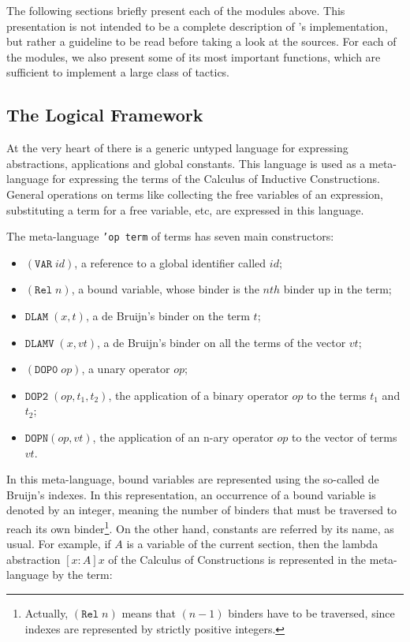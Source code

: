 \vspace{1em}

The following sections briefly present each of the modules above.
This presentation is not intended to be a complete description of \Coq's
implementation, but rather a guideline to be read before taking a look
at the sources. For each of the modules, we also present some of its
most important functions, which are sufficient to implement a large
class of tactics.


\subsection[The Logical Framework]{The Logical Framework\label{LogicalFramework}}

At the very heart of \Coq there is a generic untyped language for
expressing abstractions, applications and global constants. This
language is used as a meta-language for expressing the terms of the
Calculus of Inductive Constructions. General operations on terms like
collecting the free variables of an expression, substituting a term for
a free variable, etc, are expressed in this language.

The meta-language \texttt{'op term} of terms has seven main
constructors:
\begin{itemize}
\item $(\texttt{VAR}\;id)$, a reference to a global identifier called  $id$;
\item $(\texttt{Rel}\;n)$, a bound variable, whose binder is the $nth$
      binder up in the term;
\item $\texttt{DLAM}\;(x,t)$, a de Bruijn's binder on the term $t$;
\item $\texttt{DLAMV}\;(x,vt)$, a de Bruijn's binder on all the terms of
      the vector $vt$;
\item $(\texttt{DOP0}\;op)$, a unary operator $op$;
\item $\texttt{DOP2}\;(op,t_1,t_2)$, the application of a binary
operator $op$ to the terms $t_1$ and $t_2$;
\item $\texttt{DOPN} (op,vt)$, the application of an n-ary operator $op$ to the
vector of terms $vt$.
\end{itemize}

In this meta-language, bound variables are represented using the
so-called de Bruijn's indexes. In this representation, an occurrence of
a bound variable is denoted by an integer, meaning the number of
binders that must be traversed to reach its own
binder\footnote{Actually, $(\texttt{Rel}\;n)$ means that $(n-1)$ binders
have to be traversed, since indexes are represented by strictly
positive integers.}. On the other hand, constants are referred by its
name, as usual. For example, if $A$ is a variable of the current
section, then the lambda abstraction $[x:A]x$ of the Calculus of
Constructions is represented in the meta-language by the term:


